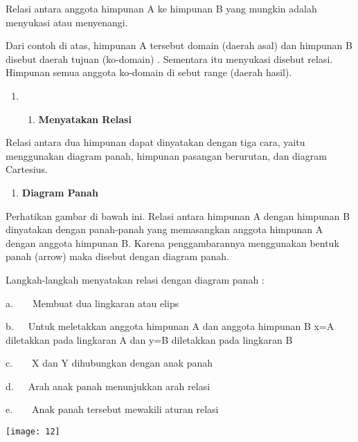 \documentclass[11pt,fleqn]{book} %
\begin{document}
\begin{myEnumerate}
\begin{itemize}
\noindent Relasi antara anggota himpunan A ke himpunan B yang mungkin adalah menyukasi atau menyenangi.

\noindent Dari contoh di atas, himpunan A tersebut domain (daerah asal) dan himpunan B disebut daerah tujuan (ko-domain) . Sementara itu menyukasi disebut relasi. Himpunan semua anggota ko-domain di sebut range (daerah hasil).

\noindent 

\begin{enumerate}
\item \begin{enumerate}
\item  \textbf{Menyatakan Relasi}
\end{enumerate}
\end{enumerate}

\noindent 

Relasi antara dua himpunan dapat dinyatakan dengan tiga cara, yaitu menggunakan diagram panah, himpunan pasangan berurutan, dan diagram Cartesius.



\begin{enumerate}
\item  \textbf{Diagram Panah}
\end{enumerate}

\noindent 

\noindent Perhatikan gambar di bawah ini. Relasi antara himpunan A dengan himpunan B dinyatakan dengan panah-panah yang memasangkan anggota himpunan A dengan anggota himpunan B. Karena penggambarannya menggunakan bentuk panah (arrow) maka disebut dengan diagram panah.

\noindent 

\noindent Langkah-langkah menyatakan relasi dengan diagram panah :

\noindent 

\noindent a.~~~~Membuat dua lingkaran atau elips

\noindent b.~~~Untuk meletakkan anggota himpunan A dan anggota himpunan B x=A diletakkan pada lingkaran A dan y=B diletakkan pada lingkaran B

\noindent c.~~~~X dan Y dihubungkan dengan anak panah

\noindent d.~~~Arah anak panah menunjukkan arah relasi

\noindent e.~~~~Anak panah tersebut mewakili aturan relasi

\noindent 

\begin{center}
\noindent \texttt{[image: 12]}
\end{center}


\end{itemize}
\end{myEnumerate}
\end{document}
